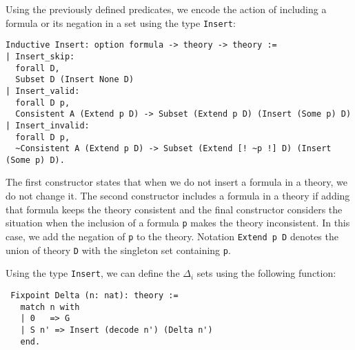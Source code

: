 \documentclass[3p,times]{elsarticle}
\begin{document}
Using the previously defined predicates, we encode the action of including a formula or its
negation in a set using the type \texttt{Insert}:

\begin{verbatim}
Inductive Insert: option formula -> theory -> theory :=
| Insert_skip:
  forall D,
  Subset D (Insert None D)
| Insert_valid:
  forall D p,
  Consistent A (Extend p D) -> Subset (Extend p D) (Insert (Some p) D)
| Insert_invalid:
  forall D p,
  ~Consistent A (Extend p D) -> Subset (Extend [! ~p !] D) (Insert (Some p) D).
\end{verbatim}

The first constructor states that when we do not insert a formula in a theory,
we do not change it. The second constructor includes a formula in a theory if
adding that formula keeps the theory consistent and the final constructor considers
the situation when the inclusion of a formula \verb|p| makes the theory inconsistent.
In this case, we add the negation of \verb|p| to the theory. Notation \texttt{Extend p D} denotes the union of theory \texttt{D} with the
singleton set containing \texttt{p}.

Using the type \texttt{Insert}, we can define the $\Delta_{i}$ sets using the
following function:

\begin{verbatim}
 Fixpoint Delta (n: nat): theory :=
   match n with
   | 0   => G
   | S n' => Insert (decode n') (Delta n')
   end.
\end{verbatim}
\end{document}
